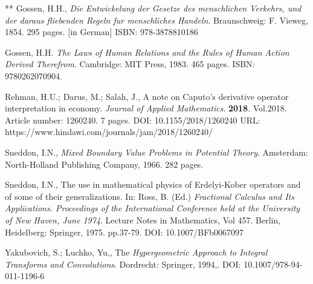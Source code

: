 \documentclass[12pt]{article}
\begin{document}
\begin{thebibliography}{**}
 Gossen, H.H., 
\textit{Die Entwickelung der Gesetze des menschlichen Verkehrs, und der daraus fliebenden Regeln fur menschliches Handeln}.
Braunschweig: F. Vieweg, 1854. 295 pages. [in German] 
ISBN: 978-3878810186

 Gossen, H.H. \textit{The Laws of Human Relations and the Rules of Human Action Derived Therefrom}. Cambridge: MIT Press, 1983. 465 pages. ISBN: 9780262070904.

 Rehman, H.U.; Darus, M.; Salah, J., 
A note on Caputo's derivative operator interpretation in economy. \textit{Journal of Applied Mathematics}. \textbf{2018}. Vol.2018. Article number: 1260240. 7 pages. 
DOI: 10.1155/2018/1260240
URL: https://www.hindawi.com/journals/jam/2018/1260240/


 Sneddon, I.N., 
\textit{Mixed Boundary Value Problems in Potential Theory}. 
Amsterdam: North-Holland Publishing Company, 1966. 282 pages. 

 Sneddon, I.N., 
The use in mathematical physics of Erdelyi-Kober operators and of some of their generalizations. In: Ross, B. (Ed.) 
\textit{Fractional Calculus and Its Applications. Proceedings of the International Conference held at the University of New Haven, June 1974}. Lecture Notes in Mathematics, Vol 457. Berlin, Heidelberg: Springer, 1975. pp.37-79.
DOI: 10.1007/BFb0067097 

 Yakubovich, S.; Luchko, Yu,, 
The 
\textit{Hypergeometric Approach to Integral Transforms and Convolutions}. 
Dordrecht: Springer, 1994,. %
DOI: 10.1007/978-94-011-1196-6


\end{thebibliography}

\end{document}
